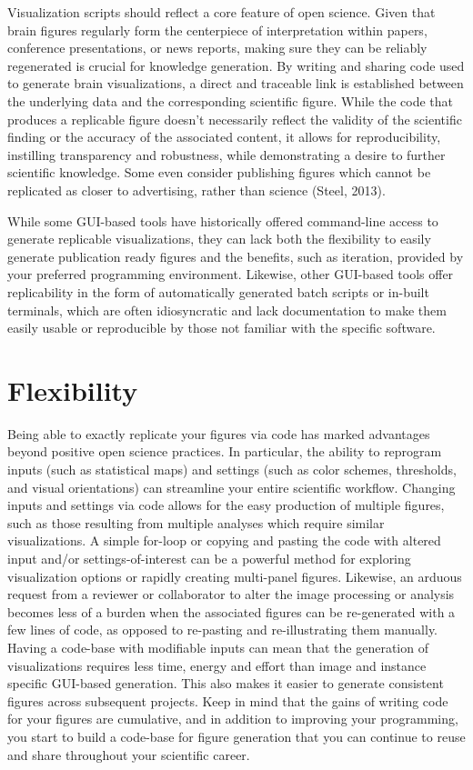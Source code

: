 \documentclass{article}
\begin{document}
Visualization scripts should reflect a core feature of open science. Given that brain figures regularly form the centerpiece of interpretation within papers, conference presentations, or news reports, making sure they can be reliably regenerated is crucial for knowledge generation. By writing and sharing code used to generate brain visualizations, a direct and traceable link is established between the underlying data and the corresponding scientific figure. While the code that produces a replicable figure doesn't necessarily reflect the validity of the scientific finding or the accuracy of the associated content, it allows for reproducibility, instilling transparency and robustness, while demonstrating a desire to further scientific knowledge. Some even consider publishing figures which cannot be replicated as closer to advertising, rather than science (Steel, 2013).

While some GUI-based tools have historically offered command-line access to generate replicable visualizations, they can lack both the flexibility to easily generate publication ready figures and the benefits, such as iteration, provided by your preferred programming environment. Likewise, other GUI-based tools offer replicability in the form of automatically generated batch scripts or in-built terminals, which are often idiosyncratic and lack documentation to make them easily usable or reproducible by those not familiar with the specific software.

\hypertarget{flexibility}{%
\section{Flexibility}\label{flexibility}}

Being able to exactly replicate your figures via code has marked advantages beyond positive open science practices. In particular, the ability to reprogram inputs (such as statistical maps) and settings (such as color schemes, thresholds, and visual orientations) can streamline your entire scientific workflow. Changing inputs and settings via code allows for the easy production of multiple figures, such as those resulting from multiple analyses which require similar visualizations. A simple for-loop or copying and pasting the code with altered input and/or settings-of-interest can be a powerful method for exploring visualization options or rapidly creating multi-panel figures. Likewise, an arduous request from a reviewer or collaborator to alter the image processing or analysis becomes less of a burden when the associated figures can be re-generated with a few lines of code, as opposed to re-pasting and re-illustrating them manually. Having a code-base with modifiable inputs can mean that the generation of visualizations requires less time, energy and effort than image and instance specific GUI-based generation. This also makes it easier to generate consistent figures across subsequent projects. Keep in mind that the gains of writing code for your figures are cumulative, and in addition to improving your programming, you start to build a code-base for figure generation that you can continue to reuse and share throughout your scientific career.
\end{document}
